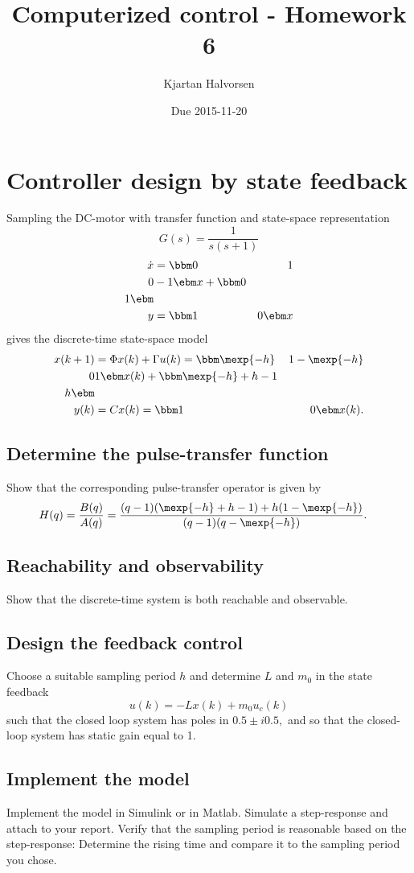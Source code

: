 \documentclass{scrartcl}
\title{Computerized control - Homework 6}
\author{Kjartan Halvorsen}
\date{Due 2015-11-20}
\begin{document}
\maketitle



\section{Controller design by state feedback}
\label{sec-1}

  Sampling the DC-motor with transfer function and state-space representation
  \[ G(s) = \frac{1}{s(s+1)} \]
   \begin{align*}
   \dot{x} &= \bbm 0 & 1\\0 & -1\ebm x + \bbm 0\\1\ebm \\
   y &= \bbm 1 & 0\ebm x
   \end{align*}
   gives the discrete-time state-space model
   \begin{align*}
   x(k+1) &= \Phi x(k) + \Gamma u(k) = \bbm \mexp{-h} & 1-\mexp{-h}\\ 0 & 1\ebm x(k) + \bbm \mexp{-h}+h-1\\ h \ebm \\
   y(k) &= Cx(k) = \bbm 1 & 0 \ebm x(k).
   \end{align*}
\subsection{Determine the pulse-transfer function}
\label{sec-1-1}

   Show that the corresponding pulse-transfer operator is given by
  \begin{equation}
  \begin{split}
   H(q) &= \frac{B(q)}{A(q)} = \frac{(q-1)(\mexp{-h}+h-1) + h(1-\mexp{-h})}{(q-1)(q-\mexp{-h})}.
  \end{split}
  \label{eq:Gd}
  \end{equation}
\subsection{Reachability and observability}
\label{sec-1-2}

   Show that the discrete-time system is both reachable and observable.
\subsection{Design the feedback control}
\label{sec-1-3}

   Choose a suitable sampling period $h$ and determine $L$ and $m_0$ in the state feedback
   \[ u(k) = -Lx(k) + m_0u_c(k) \]
   such that the closed loop system has poles in \(0.5\pm i0.5,\) and so that the closed-loop system has static gain equal to 1.
\subsection{Implement the model}
\label{sec-1-4}

   Implement the model in Simulink or in Matlab. Simulate a step-response and attach to your report. Verify that the sampling period is reasonable based on the step-response: Determine the rising time and compare it to the sampling period you chose. 
\end{document}
